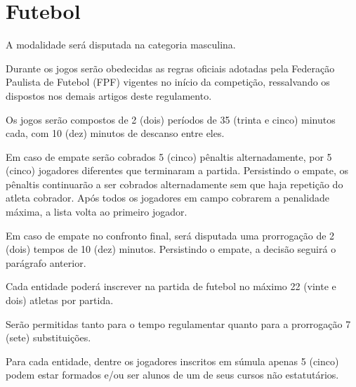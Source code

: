 {\let\clearpage\relax \chapter{Futebol}}

\begin{article}
	A modalidade será disputada na categoria masculina.
\end{article}

\begin{article}
	Durante os jogos serão obedecidas as regras oficiais adotadas pela Federação Paulista de Futebol (FPF) vigentes no início da competição, ressalvando os dispostos nos demais artigos deste regulamento.
\end{article}

\begin{article}
	Os jogos serão compostos de 2 (dois) períodos de 35 (trinta e cinco) minutos cada, com 10 (dez) minutos de descanso entre eles.

	\begin{xparagraph}
		Em caso de empate serão cobrados 5 (cinco) pênaltis alternadamente, por 5 (cinco) jogadores diferentes que terminaram a partida. Persistindo o empate, os pênaltis continuarão a ser cobrados alternadamente sem que haja repetição do atleta cobrador. Após todos os jogadores em campo cobrarem a penalidade máxima, a lista volta ao primeiro jogador.
	\end{xparagraph}

	\begin{xparagraph}
		Em caso de empate no confronto final, será disputada uma prorrogação de 2 (dois) tempos de 10 (dez) minutos. Persistindo o empate, a decisão seguirá o parágrafo anterior.
	\end{xparagraph}
\end{article}

\begin{article}
	Cada entidade poderá inscrever na partida de futebol no máximo 22 (vinte e dois) atletas por partida.
\end{article}

\begin{article}
	Serão permitidas tanto para o tempo regulamentar quanto para a prorrogação 7 (sete) substituições.
\end{article}

\begin{article}
	Para cada entidade, dentre os jogadores inscritos em súmula apenas 5 (cinco) podem estar formados e/ou ser alunos de um de seus cursos não estatutários.
\end{article}
